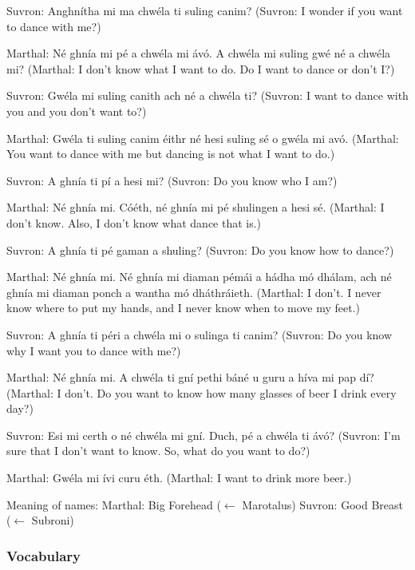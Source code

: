Suvron: Anghn\'{i}tha mi ma chw\'{e}la ti suling canim?
(Suvron: I wonder if you want to dance with me?)

Marthal: N\'{e} ghn\'{i}a mi p\'{e} a chw\'{e}la mi \'{a}v\'{o}. A chw\'{e}la mi suling gw\'{e} n\'{e} a chw\'{e}la mi?
(Marthal: I don't know what I want to do. Do I want to dance or don't I?)

Suvron: Gw\'{e}la mi suling canith ach n\'{e} a chw\'{e}la ti?
(Suvron: I want to dance with you and you don't want to?)

Marthal: Gw\'{e}la ti suling canim \'{e}ithr n\'{e} hesi suling s\'{e} o gw\'{e}la mi av\'{o}.
(Marthal: You want to dance with me but dancing is not what I want to do.)

Suvron: A ghn\'{i}a ti p\'{i} a hesi mi?
(Suvron: Do you know who I am?)

Marthal: N\'{e} ghn\'{i}a mi. C\'{o}\'{e}th, n\'{e} ghn\'{i}a mi p\'{e} shulingen a hesi s\'{e}.
(Marthal: I don't know. Also, I don't know what dance that is.)

Suvron: A ghn\'{i}a ti p\'{e} gaman a shuling?
(Suvron: Do you know how to dance?)

Marthal: N\'{e} ghn\'{i}a mi. N\'{e} ghn\'{i}a mi diaman p\'{e}m\'{a}i a h\'{a}dha m\'{o} dh\'{a}lam, ach n\'{e} ghn\'{i}a mi diaman ponch a wantha m\'{o} dh\'{a}thr\'{a}ieth.
(Marthal: I don't. I never know where to put my hands, and I never know when to move my feet.)

Suvron: A ghn\'{i}a ti p\'{e}ri a chw\'{e}la mi o sulinga ti canim?
(Suvron: Do you know why I want you to dance with me?)

Marthal: N\'{e} ghn\'{i}a mi. A chw\'{e}la ti gn\'{i} pethi b\'{a}n\'{e} u guru a h\'{i}va mi pap d\'{i}?
(Marthal: I don't. Do you want to know how many glasses of beer I drink every day?)

Suvron: Esi mi certh o n\'{e} chw\'{e}la mi gn\'{i}. Duch, p\'{e} a chw\'{e}la ti \'{a}v\'{o}?
(Suvron: I'm sure that I don't want to know. So, what do you want to do?)

Marthal: Gw\'{e}la mi \'{i}vi curu \'{e}th.
(Marthal: I want to drink more beer.)

Meaning of names:
Marthal: Big Forehead ($\leftarrow$ Marotalus)
Suvron: Good Breast ($\leftarrow$ Subroni)

\subsubsection{Vocabulary}


